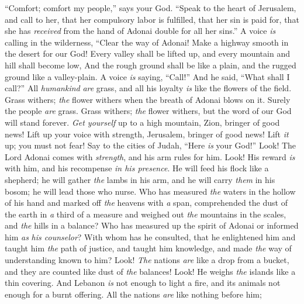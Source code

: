 \begin{biblechapter} %
 “Comfort; comfort my people,” says your God.
\verse “Speak to the heart of Jerusalem, and call to her,
\verse that her compulsory labor is fulfilled, that her sin is paid for, 
that she has \textit{received} from the hand of Adonai double for all her sins.”
\verse A voice \textit{is} calling in the wilderness, “Clear the way of Adonai! 
Make a highway smooth in the desert for our God!
\verse Every valley shall be lifted up, 
and every mountain and hill shall become low, 
And the rough ground shall be like a plain, 
and the rugged ground like a valley-plain.
\verse A voice \textit{is} saying, “Call!” 
And he said, “What shall I call?” 
All \textit{humankind} \textit{are} grass, 
and all his loyalty \textit{is} like the flowers of the field.
\verse Grass withers; \textit{the} flower withers 
when the breath of Adonai blows on it. 
Surely the people \textit{are} grass.
\verse Grass withers; \textit{the} flower withers, 
but the word of our God will stand forever.
\verse \textit{Get yourself} up to a high mountain, Zion, bringer of good news! 
Lift up your voice with strength, Jerusalem, bringer of good news! 
Lift \textit{it} up; you must not fear! 
Say to the cities of Judah, “Here \textit{is} your God!”
\verse Look! The Lord Adonai comes with \textit{strength}, 
and his arm rules for him. 
Look! His reward \textit{is} with him, 
and his recompense \textit{in his presence}.
\verse He will feed his flock like a shepherd; 
he will gather \textit{the} lambs in his arm, 
and he will carry \textit{them} in his bosom; 
he will lead those who nurse.
\verse Who has measured \textit{the} waters in the hollow of his hand 
and marked off \textit{the} heavens with \textit{a} span, 
comprehended the dust of the earth in \textit{a} third of a measure 
and weighed out \textit{the} mountains in the scales, and \textit{the} hills in a balance?
\verse Who has measured up the spirit of Adonai 
or informed him \textit{as} \textit{his counselor}?
\verse With whom has he consulted, that he enlightened him 
and taught him \textit{the} path of justice, 
and taught him knowledge, 
and made \textit{the} way of understanding known to him?
\verse Look! \textit{The} nations \textit{are} like a drop from a bucket, 
and they are counted like dust of \textit{the} balances! 
Look! He weighs \textit{the} islands like a thin covering.
\verse And Lebanon \textit{is} not enough to light a fire, 
and its animals not enough for a burnt offering.
\verse All the nations \textit{are} like nothing before him; 

\end{biblechapter}
